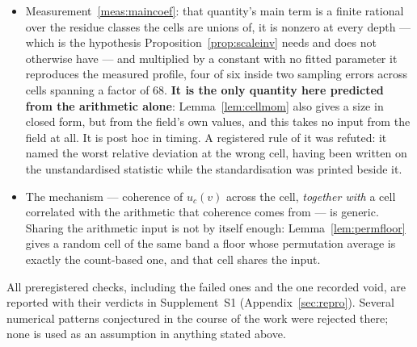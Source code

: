 \documentclass[11pt,a4paper]{article}
\theoremstyle{plain}
\theoremstyle{definition}
\theoremstyle{remark}
\begin{document}
\begin{itemize}
\item Measurement~\ref{meas:maincoef}: that quantity's main term is a
finite rational over the residue classes the cells are unions of, it
is nonzero at every depth --- which is the hypothesis
Proposition~\ref{prop:scaleinv} needs and does not otherwise have ---
and multiplied by a constant with no fitted parameter it reproduces
the measured profile, four of six inside two sampling errors across
cells spanning a factor of $68$. \textbf{It is the only quantity here
predicted from the arithmetic alone}: Lemma~\ref{lem:cellmom} also
gives a size in closed form, but from the field's own values, and this
takes no input from the field at all. It is post hoc in timing. A registered rule of it was refuted: it named the worst
relative deviation at the wrong cell, having been written on the
unstandardised statistic while the standardisation was printed beside
it.

\item The mechanism --- coherence of $u_c(v)$ across the cell,
\emph{together with} a cell correlated with the arithmetic that
coherence comes from --- is generic. Sharing the arithmetic input is
not by itself enough: Lemma~\ref{lem:permfloor} gives a random cell of
the same band a floor whose permutation average is exactly the
count-based one, and that cell shares the input.
\end{itemize}

All preregistered checks, including the failed ones and the one
recorded void, are reported with their verdicts in Supplement~S1
(Appendix~\ref{sec:repro}). Several numerical patterns conjectured in
the course of the work were rejected there; none is used as an
assumption in anything stated above.
\end{document}
